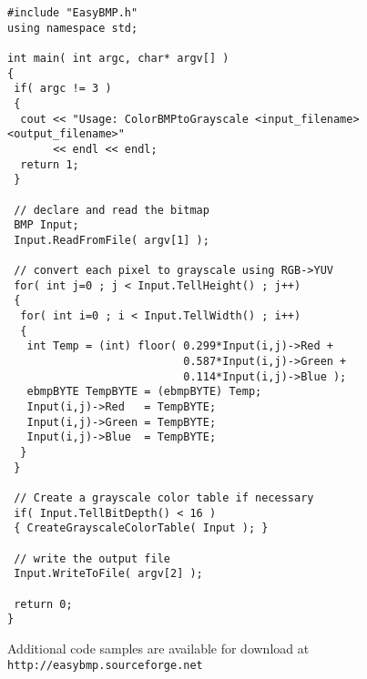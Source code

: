 \documentclass[12pt]{article}
\newcommand{\WebAddress}{\texttt{http://easybmp.sourceforge.net}}
\begin{document}
\begin{verbatim}
#include "EasyBMP.h"
using namespace std;

int main( int argc, char* argv[] )
{
 if( argc != 3 )
 {
  cout << "Usage: ColorBMPtoGrayscale <input_filename> <output_filename>" 
       << endl << endl;
  return 1; 
 }  

 // declare and read the bitmap
 BMP Input;
 Input.ReadFromFile( argv[1] );

 // convert each pixel to grayscale using RGB->YUV
 for( int j=0 ; j < Input.TellHeight() ; j++)
 {
  for( int i=0 ; i < Input.TellWidth() ; i++)
  {
   int Temp = (int) floor( 0.299*Input(i,j)->Red + 
                           0.587*Input(i,j)->Green + 
                           0.114*Input(i,j)->Blue );
   ebmpBYTE TempBYTE = (ebmpBYTE) Temp;
   Input(i,j)->Red   = TempBYTE;
   Input(i,j)->Green = TempBYTE;
   Input(i,j)->Blue  = TempBYTE;
  }
 }
 
 // Create a grayscale color table if necessary 
 if( Input.TellBitDepth() < 16 )
 { CreateGrayscaleColorTable( Input ); }

 // write the output file
 Input.WriteToFile( argv[2] );

 return 0;
}
\end{verbatim}
Additional code samples are available for download at \\

\WebAddress{}
\end{document}
